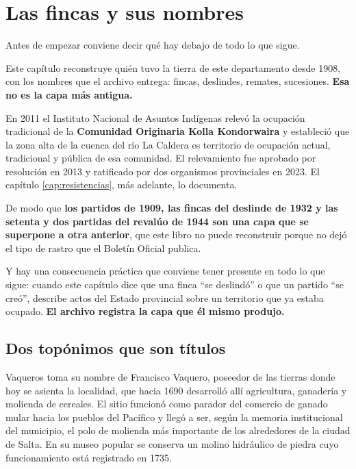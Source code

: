 \chapter{Las fincas y sus nombres}

\label{cap:fincas}
\begin{cautela}
Antes de empezar conviene decir qué hay debajo de todo lo que sigue.

Este capítulo reconstruye quién tuvo la tierra de este departamento desde 1908, con los
nombres que el archivo entrega: fincas, deslindes, remates, sucesiones. \textbf{Esa no es la
capa más antigua.}

En 2011 el Instituto Nacional de Asuntos Indígenas relevó la ocupación tradicional de la
\textbf{Comunidad Originaria Kolla Kondorwaira} y estableció que la zona alta de la cuenca
del río La Caldera es territorio de ocupación actual, tradicional y pública de esa comunidad.
El relevamiento fue aprobado por resolución en 2013 y ratificado por dos organismos
provinciales en 2023. El capítulo \ref{cap:resistencias}, más adelante, lo documenta.

De modo que \textbf{los partidos de 1909, las fincas del deslinde de 1932 y las setenta y
dos partidas del revalúo de 1944 son una capa que se superpone a otra anterior}, que este
libro no puede reconstruir porque no dejó el tipo de rastro que el Boletín Oficial publica.

Y hay una consecuencia práctica que conviene tener presente en todo lo que sigue: cuando este
capítulo dice que una finca ``se deslindó'' o que un partido ``se creó'', describe actos del
Estado provincial sobre un territorio que ya estaba ocupado. \textbf{El archivo registra la
capa que él mismo produjo.}
\end{cautela}

\section{Dos topónimos que son títulos}

Vaqueros toma su nombre de Francisco Vaquero, poseedor de las tierras donde hoy se
asienta la localidad, que hacia 1690 desarrolló allí agricultura, ganadería y molienda de
cereales. El sitio funcionó como parador del comercio de ganado mular hacia los pueblos
del Pacífico y llegó a ser, según la memoria institucional del municipio, el polo de
molienda más importante de los alrededores de la ciudad de Salta. En su museo popular se
conserva un molino hidráulico de piedra cuyo funcionamiento está registrado en 1735.

